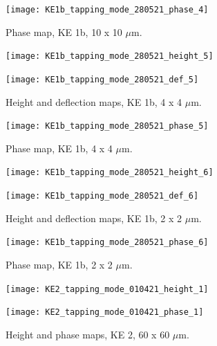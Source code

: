\begin{figure}[H]
\centering
  \texttt{[image: KE1b\_tapping\_mode\_280521\_phase\_4]}
\caption[Phase map, KE 1b]{Phase map, KE 1b, 10 x 10 $\mu$m.}
\label{fig:afm_ke1b_phase_3}
\end{figure}


\begin{figure}[H]
\centering
\begin{minipage}{.45\textwidth}
  \centering
  \texttt{[image: KE1b\_tapping\_mode\_280521\_height\_5]}
\end{minipage}
\begin{minipage}{.45\textwidth}
  \centering
  \texttt{[image: KE1b\_tapping\_mode\_280521\_def\_5]}
\end{minipage}
\caption[Height and deflection maps, KE 1b]{Height and deflection maps, KE 1b, 4 x 4 $\mu$m.}
\label{fig:afm_ke1b_height_def_4}
\end{figure}

\begin{figure}[H]
\centering
  \texttt{[image: KE1b\_tapping\_mode\_280521\_phase\_5]}
\caption[Phase map, KE 1b]{Phase map, KE 1b, 4 x 4 $\mu$m.}
\label{fig:afm_ke1b_phase_4}
\end{figure}


\begin{figure}[H]
\centering
\begin{minipage}{.45\textwidth}
  \centering
  \texttt{[image: KE1b\_tapping\_mode\_280521\_height\_6]}
\end{minipage}
\begin{minipage}{.45\textwidth}
  \centering
  \texttt{[image: KE1b\_tapping\_mode\_280521\_def\_6]}
\end{minipage}
\caption[Height and deflection maps, KE 1b]{Height and deflection maps, KE 1b, 2 x 2 $\mu$m.}
\label{fig:afm_ke1b_height_def_6}
\end{figure}

\begin{figure}[H]
\centering
  \texttt{[image: KE1b\_tapping\_mode\_280521\_phase\_6]}
\caption[Phase map, KE 1b]{Phase map, KE 1b, 2 x 2 $\mu$m.}
\label{fig:afm_ke1b_phase_6}
\end{figure}



\begin{figure}[H]
\centering
\begin{minipage}{.45\textwidth}
  \centering
  \texttt{[image: KE2\_tapping\_mode\_010421\_height\_1]}
\end{minipage}
\begin{minipage}{.45\textwidth}
  \centering
  \texttt{[image: KE2\_tapping\_mode\_010421\_phase\_1]}
\end{minipage}
\caption[Height and phase maps, KE 2]{Height and phase maps, KE 2, 60 x 60 $\mu$m.}
\label{fig:afm_ke2_height_phase_1}
\end{figure}


